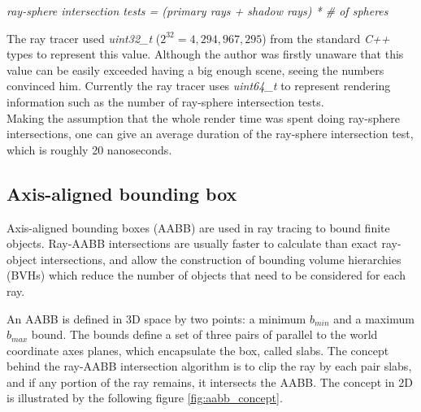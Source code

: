 \documentclass{article}
\begin{document}
\centerline{\textit{ray-sphere intersection tests = (primary rays + shadow rays) * \# of spheres}}

The ray tracer used \textit{uint32\_t} ($2^{32} = 4,294,967,295$) from the standard \textit{C++} types to represent this value. Although the author was firstly unaware that this value can be easily exceeded having a big enough scene, seeing the numbers convinced him. Currently the ray tracer uses \textit{uint64\_t} to represent rendering information such as the number of ray-sphere intersection tests. \\
Making the assumption that the whole render time was spent doing ray-sphere intersections, one can give an average duration of the ray-sphere intersection test, which is roughly 20 nanoseconds. 

\subsection{Axis-aligned bounding box}

Axis-aligned bounding boxes (AABB) are used in ray tracing to bound finite objects. Ray-AABB intersections are usually faster to calculate than exact ray-object intersections, and allow the construction of bounding volume hierarchies (BVHs) which reduce the number of objects that need to be considered for each ray. \cite{aabb}

\vspace*{\baselineskip}

An AABB is defined in 3D space by two points: a minimum $b_{min}$ and a maximum $b_{max}$ bound. The bounds define a set of three pairs of parallel to the world coordinate axes planes, which encapsulate the box, called slabs. The concept behind the ray-AABB intersection algorithm is to clip the ray by each pair slabs, and if any portion of the ray remains, it intersects the AABB. The concept in 2D is illustrated by the following figure \ref{fig:aabb_concept}.
\end{document}
